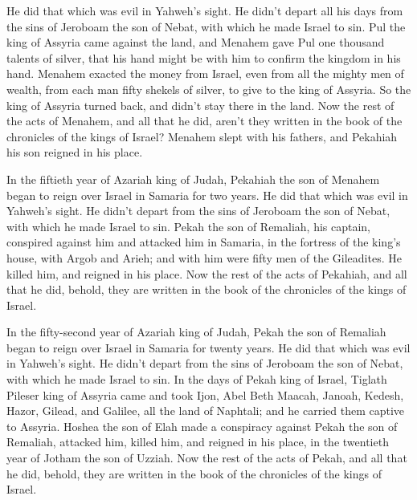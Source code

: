 {He did that which was evil in Yahweh’s sight. He didn’t depart all his days from the sins of Jeroboam the son of Nebat, with which he made Israel to sin.
Pul the king of Assyria came against the land, and Menahem gave Pul one thousand talents of silver, that his hand might be with him to confirm the kingdom in his hand.
Menahem exacted the money from Israel, even from all the mighty men of wealth, from each man fifty shekels of silver, to give to the king of Assyria. So the king of Assyria turned back, and didn’t stay there in the land.
Now the rest of the acts of Menahem, and all that he did, aren’t they written in the book of the chronicles of the kings of Israel?
Menahem slept with his fathers, and Pekahiah his son reigned in his place.
\par }{\PP {}In the fiftieth year of Azariah king of Judah, Pekahiah the son of Menahem began to reign over Israel in Samaria for two years.
He did that which was evil in Yahweh’s sight. He didn’t depart from the sins of Jeroboam the son of Nebat, with which he made Israel to sin.
Pekah the son of Remaliah, his captain, conspired against him and attacked him in Samaria, in the fortress of the king’s house, with Argob and Arieh; and with him were fifty men of the Gileadites. He killed him, and reigned in his place.
Now the rest of the acts of Pekahiah, and all that he did, behold, they are written in the book of the chronicles of the kings of Israel.
\par }{\PP {}In the fifty-second year of Azariah king of Judah, Pekah the son of Remaliah began to reign over Israel in Samaria for twenty years.
He did that which was evil in Yahweh’s sight. He didn’t depart from the sins of Jeroboam the son of Nebat, with which he made Israel to sin.
In the days of Pekah king of Israel, Tiglath Pileser king of Assyria came and took Ijon, Abel Beth Maacah, Janoah, Kedesh, Hazor, Gilead, and Galilee, all the land of Naphtali; and he carried them captive to Assyria.
Hoshea the son of Elah made a conspiracy against Pekah the son of Remaliah, attacked him, killed him, and reigned in his place, in the twentieth year of Jotham the son of Uzziah.
Now the rest of the acts of Pekah, and all that he did, behold, they are written in the book of the chronicles of the kings of Israel.
}
